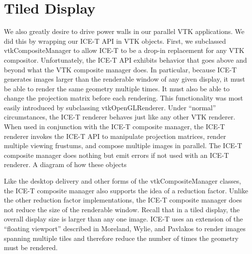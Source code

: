 \documentclass[twocolumn]{article}
\begin{document}
  \section{Tiled Display}
  \label{sec:tiled_display}


  We also greatly desire to drive power walls in our parallel VTK
  applications.  We did this by wrapping our ICE-T API in VTK objects.
  First, we subclassed vtkCompositeManager to allow ICE-T to be a drop-in
  replacement for any VTK compositor.  Unfortunately, the ICE-T API
  exhibits behavior that goes above and beyond what the VTK composite
  manager does.  In particular, because ICE-T generates images larger than
  the renderable window of any given display, it must be able to render the
  same geometry multiple times.  It must also be able to change the
  projection matrix before each rendering.  This functionality was most
  easily introduced by subclassing vtkOpenGLRenderer.  Under ``normal''
  circumstances, the ICE-T renderer behaves just like any other VTK
  renderer.  When used in conjunction with the ICE-T composite manager, the
  ICE-T renderer invokes the ICE-T API to manipulate projection matrices,
  render multiple viewing frustums, and compose multiple images in
  parallel.  The ICE-T composite manager does nothing but emit errors if
  not used with an ICE-T renderer.  A diagram of how these objects

  Like the desktop delivery and other forms of the vtkCompositeManager
  classes, the ICE-T composite manager also supports the idea of a
  reduction factor.  Unlike the other reduction factor implementations, the
  ICE-T composite manager does not reduce the size of the renderable
  window.  Recall that in a tiled display, the overall display size is
  larger than any one image.  ICE-T uses an extension of the ``floating
  viewport'' described in Moreland, Wylie, and Pavlakos \cite{Moreland01}
  to render images spanning multiple tiles and therefore reduce the number
  of times the geometry must be rendered.
\end{document}
